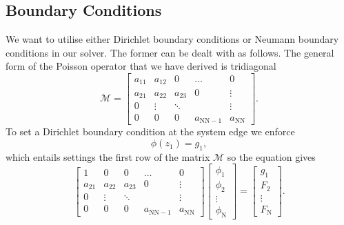 \documentclass[reprint, amsmath,amssymb, aps]{revtex4-1}
\begin{document}
\subsection{Boundary Conditions}
We want to utilise either Dirichlet boundary conditions or Neumann boundary conditions in our solver. The former can be dealt with as follows. The general form of the Poisson operator that we have derived is tridiagonal
\begin{equation}
  \mathcal{M} = \begin{bmatrix} 
    a_{11} & a_{12} & 0 & \dots & 0\\
    a_{21} & a_{22} & a_{23} & 0 & \vdots \\
    0 & \vdots  & \ddots   &  & \vdots \\
    0 & 0 & 0 & a_{\mathrm{N} \mathrm{N}-1} & a_{\mathrm{NN}}
    \end{bmatrix}.
\end{equation}
To set a Dirichlet boundary condition at the system edge we enforce
\begin{equation}
	\phi\left(z_1\right) = g_1,
\end{equation}
which entails settings the first row of the matrix $\mathcal{M}$ so the equation gives
\begin{equation}
  \begin{bmatrix} 
    1 & 0 & 0 & \dots & 0\\
    a_{21} & a_{22} & a_{23} & 0 & \vdots \\
    0 & \vdots  & \ddots   &  & \vdots \\
    0 & 0 & 0 & a_{\mathrm{N} \mathrm{N}-1} & a_{\mathrm{NN}}
    \end{bmatrix} 
    \begin{bmatrix}
    \phi_1 \\
    \phi_2 \\
    \vdots \\
    \phi_\mathrm{N}	
    \end{bmatrix}
    =  \begin{bmatrix}
    g_1 \\
    F_2 \\
    \vdots \\
    F_\mathrm{N}	
    \end{bmatrix}.
\end{equation}
\end{document}
